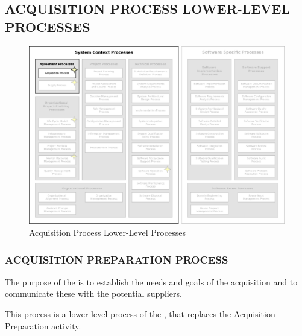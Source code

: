 	\subsection{ACQUISITION PROCESS LOWER-LEVEL PROCESSES\label{llsubsec:acquisition_processes}}
	\begin{figure}[h]
		\centering
		\includegraphics[width=15cm,keepaspectratio]{figures/life-cycle-process-groups-lower-level-acquisition-processes.pdf}
		\caption{Acquisition Process Lower-Level Processes}
		\label{fig:lower_level_acquisition_processes}
	\end{figure}

		\subsubsection{ACQUISITION PREPARATION PROCESS\label{llproc:acquisition_preparation_process}}

			\begin{adjustwidth}{2em}{0pt} 

				The purpose of the  is to establish the needs and goals of the acquisition and to communicate these with the potential suppliers.

				This process is a lower-level process of the , that replaces the Acquisition Preparation activity.

			\end{adjustwidth}

